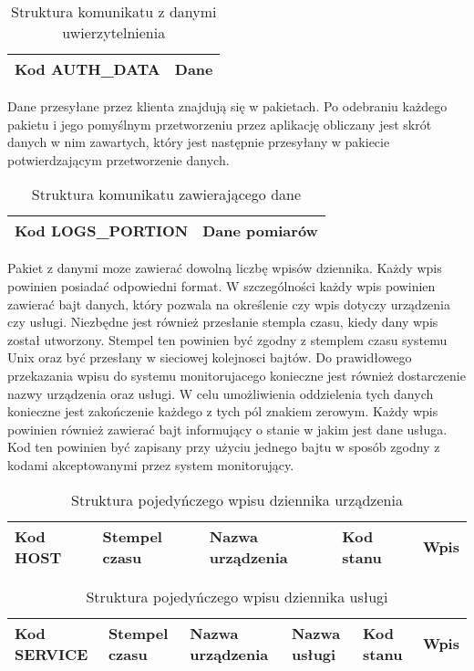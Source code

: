 \begin{table}[H]
\centering
\caption{Struktura komunikatu z danymi uwierzytelnienia }
\begin{tabular}{|p{3cm}|p{6cm}|}
\hline
Kod AUTH\_DATA & Dane \\
\hline
\end{tabular}
\end{table}

Dane przesyłane przez klienta znajdują się w pakietach. Po odebraniu
każdego pakietu i jego pomyślnym przetworzeniu przez aplikację
obliczany jest skrót danych w nim zawartych, który jest następnie
przesyłany w pakiecie potwierdzającym przetworzenie danych. 

\begin{table}[H]
\centering
\caption{Struktura komunikatu zawierającego dane }
\begin{tabular}{|p{3cm}|p{6cm}|}
\hline
Kod LOGS\_PORTION & Dane pomiarów  \\
\hline
\end{tabular}
\end{table}

Pakiet z danymi moze zawierać dowolną liczbę wpisów dziennika. Każdy
wpis powinien posiadać odpowiedni format. W szczególności każdy wpis
powinien zawierać bajt danych, który pozwala na określenie czy wpis
dotyczy urządzenia czy usługi. Niezbędne jest również przesłanie
stempla czasu, kiedy dany wpis został utworzony. Stempel ten powinien
być zgodny z stemplem czasu systemu Unix oraz być przesłany w
sieciowej kolejnosci bajtów. Do prawidłowego przekazania wpisu do
systemu monitorujacego konieczne jest również dostarczenie nazwy
urządzenia oraz usługi. W celu umożliwienia oddzielenia tych danych
konieczne jest zakończenie każdego z tych pól znakiem zerowym. Każdy
wpis powinien również zawierać bajt informujący o stanie w jakim jest
dane usługa. Kod ten powinien być zapisany przy użyciu jednego bajtu w
sposób zgodny z kodami akceptowanymi przez system monitorujący.

\begin{table}[H]
\centering
\caption{Struktura pojedyńczego wpisu dziennika urządzenia }
\begin{tabular}{|p{2cm}|p{3cm}|p{4cm}|p{2cm}|p{2cm}|}
\hline
Kod HOST & Stempel czasu & Nazwa urządzenia & Kod stanu & Wpis  \\
\hline
\end{tabular}
\end{table}

\begin{table}[H]
\centering
\caption{Struktura pojedyńczego wpisu dziennika usługi }
\begin{tabular}{|p{2cm}|p{2cm}|p{3cm}|p{2cm}|p{1cm}|p{2cm}|}
  \hline
  \raggedright{Kod SERVICE} & \raggedright{Stempel czasu} & \raggedright{Nazwa urządzenia} & \raggedright{Nazwa usługi} & Kod stanu & Wpis  \\
  \hline
\end{tabular}
\end{table}

